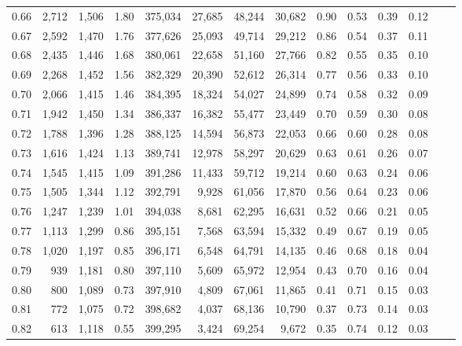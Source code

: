 \begin{tabular}{rrrrrrrrrrrrrr}
0.66 &  2,712 &  1,506 &     1.80 &  375,034 &   27,685 &  48,244 &  30,682 &  0.90 &  0.53 &  0.39 &      0.12 \\
0.67 &  2,592 &  1,470 &     1.76 &  377,626 &   25,093 &  49,714 &  29,212 &  0.86 &  0.54 &  0.37 &      0.11 \\
0.68 &  2,435 &  1,446 &     1.68 &  380,061 &   22,658 &  51,160 &  27,766 &  0.82 &  0.55 &  0.35 &      0.10 \\
0.69 &  2,268 &  1,452 &     1.56 &  382,329 &   20,390 &  52,612 &  26,314 &  0.77 &  0.56 &  0.33 &      0.10 \\
0.70 &  2,066 &  1,415 &     1.46 &  384,395 &   18,324 &  54,027 &  24,899 &  0.74 &  0.58 &  0.32 &      0.09 \\
0.71 &  1,942 &  1,450 &     1.34 &  386,337 &   16,382 &  55,477 &  23,449 &  0.70 &  0.59 &  0.30 &      0.08 \\
0.72 &  1,788 &  1,396 &     1.28 &  388,125 &   14,594 &  56,873 &  22,053 &  0.66 &  0.60 &  0.28 &      0.08 \\
0.73 &  1,616 &  1,424 &     1.13 &  389,741 &   12,978 &  58,297 &  20,629 &  0.63 &  0.61 &  0.26 &      0.07 \\
0.74 &  1,545 &  1,415 &     1.09 &  391,286 &   11,433 &  59,712 &  19,214 &  0.60 &  0.63 &  0.24 &      0.06 \\
0.75 &  1,505 &  1,344 &     1.12 &  392,791 &    9,928 &  61,056 &  17,870 &  0.56 &  0.64 &  0.23 &      0.06 \\
0.76 &  1,247 &  1,239 &     1.01 &  394,038 &    8,681 &  62,295 &  16,631 &  0.52 &  0.66 &  0.21 &      0.05 \\
0.77 &  1,113 &  1,299 &     0.86 &  395,151 &    7,568 &  63,594 &  15,332 &  0.49 &  0.67 &  0.19 &      0.05 \\
0.78 &  1,020 &  1,197 &     0.85 &  396,171 &    6,548 &  64,791 &  14,135 &  0.46 &  0.68 &  0.18 &      0.04 \\
0.79 &    939 &  1,181 &     0.80 &  397,110 &    5,609 &  65,972 &  12,954 &  0.43 &  0.70 &  0.16 &      0.04 \\
0.80 &    800 &  1,089 &     0.73 &  397,910 &    4,809 &  67,061 &  11,865 &  0.41 &  0.71 &  0.15 &      0.03 \\
0.81 &    772 &  1,075 &     0.72 &  398,682 &    4,037 &  68,136 &  10,790 &  0.37 &  0.73 &  0.14 &      0.03 \\
0.82 &    613 &  1,118 &     0.55 &  399,295 &    3,424 &  69,254 &   9,672 &  0.35 &  0.74 &  0.12 &      0.03 \\

\end{tabular}
